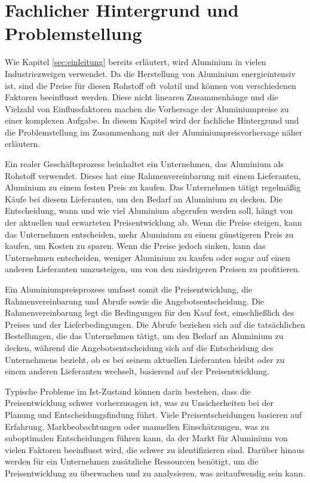 \section{Fachlicher Hintergrund und Problemstellung}

Wie Kapitel \ref{sec:einleitung} bereits erläutert, wird Aluminium in vielen Industriezweigen verwendet. Da die Herstellung von Aluminium energieintensiv ist, sind die Preise für diesen Rohstoff oft volatil und können von verschiedenen Faktoren beeinflusst werden. Diese nicht linearen Zusammenhänge und die Vielzahl von Einflussfaktoren machen die Vorhersage der Aluminiumpreise zu einer komplexen Aufgabe. In diesem Kapitel wird der fachliche Hintergrund und die Problemstellung im Zusammenhang mit der Aluminiumpreisvorhersage näher erläutern.

Ein realer Geschäftsprozess beinhaltet ein Unternehmen, das Aluminium als Rohstoff verwendet. Dieses hat eine Rahmenvereinbarung mit einem Lieferanten, Aluminium zu einem festen Preis zu kaufen. Das Unternehmen tätigt regelmäßig Käufe bei diesem Lieferanten, um den Bedarf an Aluminium zu decken. Die Entscheidung, wann und wie viel Aluminium abgerufen werden soll, hängt von der aktuellen und erwarteten Preisentwicklung ab. Wenn die Preise steigen, kann das Unternehmen entscheiden, mehr Aluminium zu einem günstigeren Preis zu kaufen, um Kosten zu sparen. Wenn die Preise jedoch sinken, kann das Unternehmen entscheiden, weniger Aluminium zu kaufen oder sogar auf einen anderen Lieferanten umzusteigen, um von den niedrigeren Preisen zu profitieren.

Ein Aluminiumpreisprozess umfasst somit die Preisentwicklung, die Rahmenvereinbarung und Abrufe sowie die Angebotsentscheidung. Die Rahmenvereinbarung legt die Bedingungen für den Kauf fest, einschließlich des Preises und der Lieferbedingungen. Die Abrufe beziehen sich auf die tatsächlichen Bestellungen, die das Unternehmen tätigt, um den Bedarf an Aluminium zu decken, während die Angebotsentscheidung sich auf die Entscheidung des Unternehmens bezieht, ob es bei seinem aktuellen Lieferanten bleibt oder zu einem anderen Lieferanten wechselt, basierend auf der Preisentwicklung.  

Typische Probleme im Ist-Zustand können darin bestehen, dass die Preisentwicklung schwer vorherzusagen ist, was zu Unsicherheiten bei der Planung und Entscheidungsfindung führt. Viele Preisentscheidungen basieren auf Erfahrung, Markbeobachtungen oder manuellen Einschätzungen, was zu suboptimalen Entscheidungen führen kann, da der Markt für Aluminium von vielen Faktoren beeinflusst wird, die schwer zu identifizieren sind. Darüber hinaus werden für ein Unternehmen zusätzliche Ressourcen benötigt, um die Preisentwicklung zu überwachen und zu analysieren, was zeitaufwendig sein kann.

